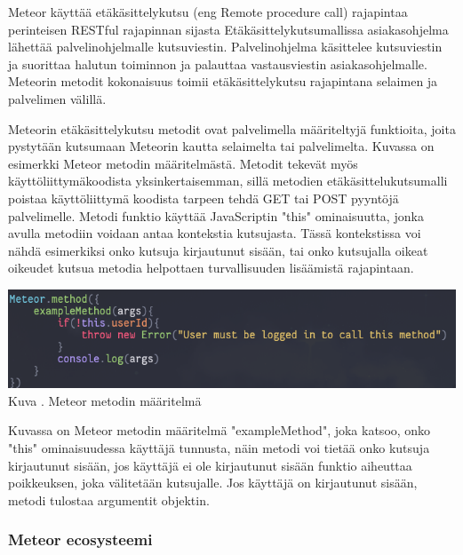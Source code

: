 


Meteor käyttää etäkäsittelykutsu (eng Remote procedure call) rajapintaa perinteisen RESTful rajapinnan sijasta
Etäkäsittelykutsumallissa asiakasohjelma lähettää palvelinohjelmalle kutsuviestin.
Palvelinohjelma käsittelee kutsuviestin ja suorittaa halutun toiminnon ja palauttaa vastausviestin asiakasohjelmalle.
Meteorin metodit kokonaisuus toimii etäkäsittelykutsu rajapintana selaimen ja palvelimen välillä. 
\medskip



Meteorin etäkäsittelykutsu metodit ovat palvelimella määriteltyjä funktioita, joita pystytään kutsumaan Meteorin kautta selaimelta tai palvelimelta. 
Kuvassa \nextImageCount{} on esimerkki Meteor metodin määritelmästä.
Metodit tekevät myös käyttöliittymäkoodista yksinkertaisemman, 
sillä metodien etäkäsittelukutsumalli poistaa käyttöliittymä koodista tarpeen tehdä GET tai POST pyyntöjä palvelimelle.
Metodi funktio käyttää JavaScriptin "this"{} ominaisuutta, jonka
avulla metodiin voidaan antaa kontekstia kutsujasta.
Tässä kontekstissa voi nähdä esimerkiksi onko kutsuja kirjautunut sisään, tai onko kutsujalla oikeat oikeudet kutsua metodia helpottaen turvallisuuden lisäämistä rajapintaan.
\bigskip

\includegraphics[width=15cm]{src/public/methodexample.png}\\
Kuva \getImgCount {}. Meteor metodin määritelmä
\medskip

Kuvassa on Meteor metodin määritelmä "exampleMethod"{}, joka katsoo, onko "this"{} ominaisuudessa käyttäjä tunnusta, 
näin metodi voi tietää onko kutsuja kirjautunut sisään,
jos käyttäjä ei ole kirjautunut sisään funktio aiheuttaa poikkeuksen, joka välitetään kutsujalle.
Jos käyttäjä on kirjautunut sisään, metodi tulostaa argumentit objektin. 
\medskip




\subsubsection{Meteor ecosysteemi}

